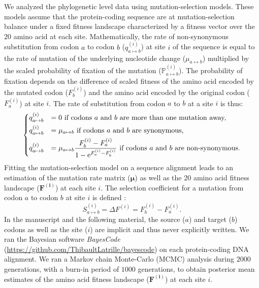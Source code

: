 \documentclass{article}
\newcommand{\UniDimArray}[1]{\bm{#1}}
\newcommand{\e}{\textrm{e}}
\newcommand{\proba}{\mathbb{P}}
\begin{document}
    We analyzed the phylogenetic level data using mutation-selection models.
    These models assume that the protein-coding sequence are at mutation-selection balance under a fixed fitness landscape characterized by a fitness vector over the $20$ amino acid at each site\cite{yang_mutationselection_2008, halpern_evolutionary_1998, rodrigue_mechanistic_2010}.
    Mathematically, the rate of non-synonymous substitution from codon $a$ to codon $b$ ($q_{a \mapsto b}^{(i)}$) at site $i$ of the sequence is equal to the rate of mutation of the underlying nucleotide change ($\mu_{a \mapsto b}$) multiplied by the scaled probability of fixation of the mutation ($\proba_{a \mapsto b}^{(i)}$).
    The probability of fixation depends on the difference of scaled fitness of the amino acid encoded by the mutated codon ($F_b^{(i)}$) and the amino acid encoded by the original codon ($F_a^{(i)}$) at site $i$\cite{wright_evolution_1931, fisher_genetical_1930}.
    The rate of substitution from codon $a$ to $b$ at a site $i$ is thus:
    \begin{equation}
        \begin{dcases}
            q_{a \mapsto b}^{(i)} & = 0 \text{ if codons $a$ and $b$ are more than one mutation away,} \\
            q_{a \mapsto b}^{(i)} & = \mu_{a \mapsto b} \text{ if codons $a$ and $b$ are synonymous,} \\
            q_{a \mapsto b}^{(i)} & = \mu_{a \mapsto b} \dfrac{F_b^{(i)} - F_a^{(i)}}{1 - \e^{F_a^{(i)} - F_b^{(i)}}} \text{ if codons $a$ and $b$ are non-synonymous}.
        \end{dcases}
    \end{equation}
    Fitting the mutation-selection model on a sequence alignment leads to an estimation of the mutation rate matrix ($\UniDimArray{\mu}$) as well as the 20 amino acid fitness landscape ($\UniDimArray{F^{(i)}}$) at each site $i$.
    The selection coefficient for a mutation from codon $a$ to codon $b$ at site $i$ is defined :
    \begin{equation}
        S_{a \mapsto b}^{(i)} = \Delta F^{(i)} = F^{(i)}_{b} - F^{(i)}_{a}.
    \end{equation}
    In the manuscript and the following material, the source ($a$) and target ($b$) codons as well as the site ($i$) are implicit and thus never explicitly written.
    We ran the Bayesian software \textit{BayesCode} (\url{https://github.com/ThibaultLatrille/bayescode}) on each protein-coding DNA alignment\cite{rodrigue_bayesian_2021}.
    We ran a Markov chain Monte-Carlo (MCMC) analysis during $2000$ generations, with a burn-in period of $1000$ generations, to obtain posterior mean estimates of the amino acid fitness landscape ($\UniDimArray{F^{(i)}}$) at each site $i$\@.
\end{document}
